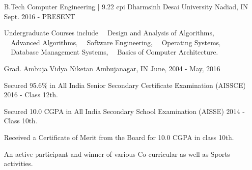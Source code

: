 


\begin{cventries}

\cventry
{B.Tech Computer Engineering | 9.22 cpi} %
{Dharmsinh Desai University} %
{Nadiad, IN} %
{Sept. 2016 - PRESENT} %
{ %
\begin{cvitems}
\item {Undergraduate Courses include ~~Design and Analysis of Algorithms, ~~Advanced Algorithms, ~~Software Engineering, ~~Operating Systems, ~~Database Management Systems, ~~Basics of Computer Architecture.}
\end{cvitems}
}




\cventry
{Grad.} %
{Ambuja Vidya Niketan} %
{Ambujanagar, IN} %
{June, 2004 - May, 2016} %
{ %
\begin{cvitems}
\item {Secured 95.6\% in All India Senior Secondary Certificate Examination (AISSCE) 2016 - Class 12th.}
\item {Secured 10.0 CGPA in All India Secondary School Examination (AISSE) 2014 - Class 10th.}
\item {Received a Certificate of Merit from the Board for 10.0 CGPA in class 10th.}
\item {An active participant and winner of various Co-curricular as well as Sports activities.}
\end{cvitems}
}

\end{cventries}

